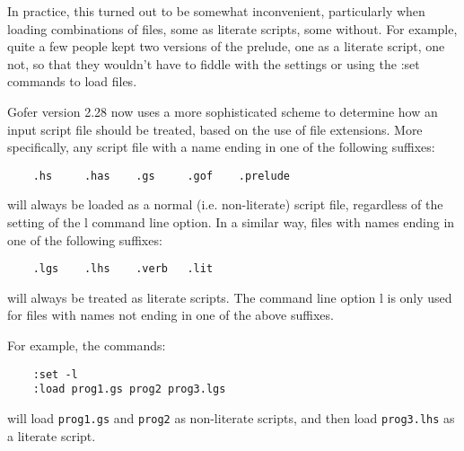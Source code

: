 In practice, this turned out to be somewhat inconvenient, particularly
when loading combinations of files, some as literate scripts, some
without.  For example, quite a few people kept two versions of the
prelude, one as a literate script, one not, so that they wouldn't have
to fiddle with the settings or using the :set commands to load files.

Gofer version 2.28 now uses a more sophisticated scheme to determine
how an input script file should be treated, based on the use of file
extensions.  More specifically, any script file with a name ending in
one of the following suffixes:
\begin{verbatim}
    .hs     .has    .gs     .gof    .prelude
\end{verbatim}
will always be loaded as a normal (i.e. non-literate) script file,
regardless of the setting of the l command line option.  In a similar
way, files with names ending in one of the following suffixes:
\begin{verbatim}
    .lgs    .lhs    .verb   .lit
\end{verbatim}
will always be treated as literate scripts.  The command line option l
is only used for files with names not ending in one of the above
suffixes.

For example, the commands:
\begin{verbatim}
    :set -l
    :load prog1.gs prog2 prog3.lgs
\end{verbatim}
will load \verb"prog1.gs" and \verb"prog2" as non-literate scripts, and then load
\verb"prog3.lhs" as a literate script.


